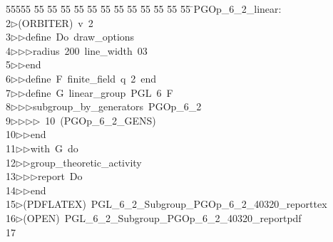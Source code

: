 %
%
\begin{tabbing}
55555 \= 55 \= 55 \= 55 \= 55 \= 55 \= 55 \= 55 \= 55 \= 55 \= 55 \= 55 \= 55 \= \>PGOp\_6\_2\_linear:\\[0pt]
2\>$\triangleright$\>(ORBITER)\ v\ 2\ \\[0pt]
3\>$\triangleright$\>$\triangleright$\>define\ Do\ draw\_options\ \\[0pt]
4\>$\triangleright$\>$\triangleright$\>$\triangleright$\>radius\ 200\ line\_width\ 03\ \\[0pt]
5\>$\triangleright$\>$\triangleright$\>end\ \\[0pt]
6\>$\triangleright$\>$\triangleright$\>define\ F\ finite\_field\ q\ 2\ end\ \\[0pt]
7\>$\triangleright$\>$\triangleright$\>define\ G\ linear\_group\ PGL\ 6\ F\ \\[0pt]
8\>$\triangleright$\>$\triangleright$\>$\triangleright$\>subgroup\_by\_generators\ PGOp\_6\_2\ \\[0pt]
9\>$\triangleright$\>$\triangleright$\>$\triangleright$\>$\triangleright$\ 10\ (PGOp\_6\_2\_GENS)\ \\[0pt]
10\>$\triangleright$\>$\triangleright$\>end\ \\[0pt]
11\>$\triangleright$\>$\triangleright$\>with\ G\ do\ \\[0pt]
12\>$\triangleright$\>$\triangleright$\>group\_theoretic\_activity\ \\[0pt]
13\>$\triangleright$\>$\triangleright$\>$\triangleright$\>report\ Do\ \\[0pt]
14\>$\triangleright$\>$\triangleright$\>end\\[0pt]
15\>$\triangleright$\>(PDFLATEX)\ PGL\_6\_2\_Subgroup\_PGOp\_6\_2\_40320\_reporttex\\[0pt]
16\>$\triangleright$\>(OPEN)\ PGL\_6\_2\_Subgroup\_PGOp\_6\_2\_40320\_reportpdf\\[0pt]
17\>\end{tabbing}
